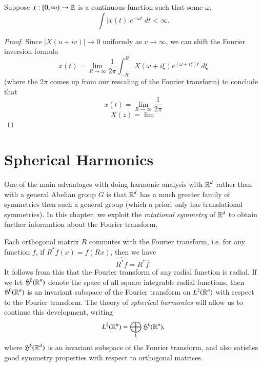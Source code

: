 \begin{theorem}
    Suppose $x: [0,\infty) \to \operatorname{\mathbb{R}}$ is a continuous function such that some $\omega$,
    \[ \int |x(t)| e^{-\omega t}\; dt < \infty. \]
\end{theorem}
\begin{proof}
    Since $|X(u + iv)| \to 0$ uniformly as $v \to \infty$, we can shift the Fourier inversion formula
    \[ x(t) = \lim_{R \to \infty} \frac{1}{2\pi} \int_{-R}^R X(\omega + i\xi) e^{(\omega + i\xi)t}\; d\xi \]
    (where the $2\pi$ comes up from our rescaling of the Fourier transform) to conclude that
    \[ x(t) = \lim_{R \to \infty} \frac{1}{2\pi} \]
    \[ X(z) = \lim_{} \]
\end{proof}












\chapter{Spherical Harmonics}

One of the main advantages with doing harmonic analysis with $\operatorname{\mathbb{R}}^d$ rather than with a general Abelian group $G$ is that $\operatorname{\mathbb{R}}^d$ has a much greater family of symmetries then such a general group (which a priori only has translational symmetries). In this chapter, we exploit the \emph{rotational symmetry} of $\operatorname{\mathbb{R}}^d$ to obtain further information about the Fourier transform.

Each orthogonal matrix $R$ commutes with the Fourier transform, i.e. for any function $f$, if $R^*f(x) = f(Rx)$, then we have
%
\[ \widehat{R^* f} = R^* \widehat{f}. \]
%
It follows from this that the Fourier transform of any radial function is radial. If we let $\mathfrak{H}^0(\operatorname{\mathbb{R}}^n)$ denote the space of all square integrable radial functions, then $\mathfrak{H}^0(\operatorname{\mathbb{R}}^n)$ is an invariant subspace of the Fourier transform on $L^2(\operatorname{\mathbb{R}}^n)$ with respect to the Fourier transform. The theory of \emph{spherical harmonics} will allow us to continue this development, writing
%
\[ L^2(\operatorname{\mathbb{R}}^n) = \bigoplus_k \mathfrak{H}^k(\operatorname{\mathbb{R}}^n), \]
%
where $\mathfrak{H}^k(\operatorname{\mathbb{R}}^d)$ is an invariant subspace of the Fourier transform, and also satisfies good symmetry properties with respect to orthogonal matrices.


